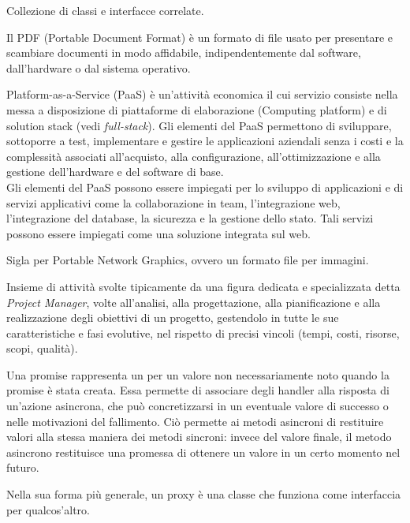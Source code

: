 Collezione di classi e interfacce correlate.

Il PDF (Portable Document Format) è un formato di file usato per presentare e scambiare documenti in modo affidabile, indipendentemente dal software, dall'hardware o dal sistema operativo.

Platform-as-a-Service (PaaS) è un'attività economica il cui servizio consiste nella messa a disposizione di piattaforme di elaborazione (Computing platform) e di solution stack (vedi \textit{full-stack}). Gli elementi del PaaS permettono di sviluppare, sottoporre a test, implementare e gestire le applicazioni aziendali senza i costi e la complessità associati all'acquisto, alla configurazione, all'ottimizzazione e alla gestione dell'hardware e del software di base.\\
Gli elementi del PaaS possono essere impiegati per lo sviluppo di applicazioni e di servizi applicativi come la collaborazione in team, l'integrazione web, l'integrazione del database, la sicurezza e la gestione dello stato. Tali servizi possono essere impiegati come una soluzione integrata sul web.

Sigla per Portable Network Graphics, ovvero un formato file per immagini.

Insieme di attività svolte tipicamente da una figura dedicata e specializzata detta \textit{Project Manager}, volte all'analisi, alla progettazione, alla pianificazione e alla realizzazione degli obiettivi di un progetto, gestendolo in tutte le sue caratteristiche e fasi evolutive, nel rispetto di precisi vincoli (tempi, costi, risorse, scopi, qualità).

Una promise rappresenta un  per un valore non necessariamente noto quando la promise è stata creata. Essa permette di associare degli handler alla risposta di un'azione asincrona, che può concretizzarsi in un eventuale valore di successo o nelle motivazioni del fallimento. Ciò permette ai metodi asincroni di restituire valori alla stessa maniera dei metodi sincroni: invece del valore finale, il metodo asincrono restituisce una promessa di ottenere un valore in un certo momento nel futuro.

Nella sua forma più generale, un proxy è una classe che funziona come interfaccia per qualcos'altro.
\clearpage

